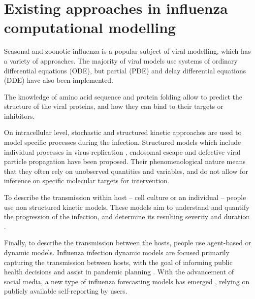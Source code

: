 \section{Existing approaches in influenza computational modelling}

Seasonal and zoonotic influenza is a popular subject of viral modelling, which has a variety of approaches. The majority of viral models use systems of ordinary differential equations (ODE), but partial (PDE) and delay differential equations (DDE) have also been implemented.

The knowledge of amino acid sequence and protein folding allow to predict the structure of the viral proteins, and how they can bind to their targets or inhibitors.

On intracellular level, stochastic and structured kinetic approaches are used to model specific processes during the infection. Structured models which include individual processes in virus replication \cite{sidorenko2004structured}, endosomal escape \cite{lagache2012modeling} and defective viral particle propagation \cite{rudiger2019multiscale} have been proposed. Their phenomenological nature means that they often rely on unobserved quantities and variables, and do not allow for inference on specific molecular targets for intervention.

To describe the transmission within host – cell culture or an individual – people use non structured kinetic models. These models aim to understand and quantify the progression of the infection, and determine its resulting severity and duration \cite{beauchemin2008modeling}.

Finally, to describe the transmission between the hosts, people use agent-based or dynamic models. Influenza infection dynamic models are focused primarily capturing the transmission between hosts, with the goal of informing public health decisions and assist in pandemic planning \cite{ferguson2006strategies, mcvernon2007model}. With the advancement of social media, a new type of influenza forecasting models has emerged \cite{pawelek2014modeling, santillana2015combining, levy2018modeling}, relying on publicly available self-reporting by users.